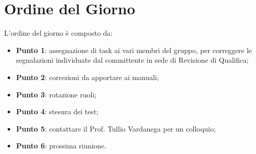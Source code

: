 \section{Ordine del Giorno}
L'ordine del giorno è composto da: 
\begin{itemize}
	\item \textbf{Punto 1}: assegnazione di task ai vari membri del gruppo, per correggere le
	segnalazioni individuate dal committente in sede di Revisione di Qualifica;
	\item \textbf{Punto 2}: correzioni da apportare ai manuali;
	\item \textbf{Punto 3}: rotazione ruoli; 
	\item \textbf{Punto 4}: stesura dei test;
	\item \textbf{Punto 5}: contattare il Prof. Tullio Vardanega per un colloquio;
	\item \textbf{Punto 6}: prossima riunione.
\end{itemize}